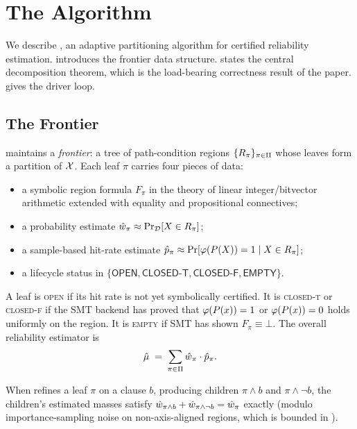 \section{The \toolname{} Algorithm}\label{sec:algorithm}

We describe \toolname{}, an adaptive partitioning algorithm for
certified reliability estimation.   introduces the frontier data
structure.   states the central decomposition
theorem, which is the load-bearing correctness result of the paper.
 gives the driver loop.

\subsection{The Frontier}\label{sec:frontier}

\toolname{} maintains a \emph{frontier}: a tree of path-condition
regions $\{R_\pi\}_{\pi \in \Pi}$ whose leaves form a partition
of $\mathcal{X}$.  Each leaf $\pi$ carries four pieces of data:
\begin{itemize}
\item a symbolic region formula $F_\pi$ in the theory of
  linear integer/bitvector arithmetic extended with equality and
  propositional connectives;
\item a probability estimate $\hat{w}_\pi \approx \Pr_{\mathcal{D}}[X \in R_\pi]$;
\item a sample-based hit-rate estimate
  $\hat{p}_\pi \approx \Pr[\varphi(P(X))=1 \mid X \in R_\pi]$;
\item a lifecycle status in
  $\{\mathsf{OPEN}, \mathsf{CLOSED\text{-}T},
    \mathsf{CLOSED\text{-}F}, \mathsf{EMPTY}\}$.
\end{itemize}

A leaf is \textsc{open} if its hit rate is not yet symbolically
certified.  It is \textsc{closed-t} or \textsc{closed-f} if the SMT
backend has proved that $\varphi(P(x)) = 1$ or $\varphi(P(x)) = 0$
holds uniformly on the region.  It is \textsc{empty} if SMT has shown
$F_\pi \equiv \bot$.  The overall reliability estimator is
\begin{equation}\label{eq:muhat-def}
  \hat{\mu} \;=\; \sum_{\pi \in \Pi} \hat{w}_\pi \cdot \hat{p}_\pi.
\end{equation}

\begin{lemma}\label{lem:mass-conservation}
  When \toolname{} refines a leaf $\pi$ on a clause $b$, producing
  children $\pi{\wedge}b$ and $\pi{\wedge}\neg b$, the children's
  estimated masses satisfy
  $\hat{w}_{\pi \wedge b} + \hat{w}_{\pi \wedge \neg b} = \hat{w}_\pi$
  exactly (modulo importance-sampling noise on non-axis-aligned
  regions, which is bounded in ).
\end{lemma}


